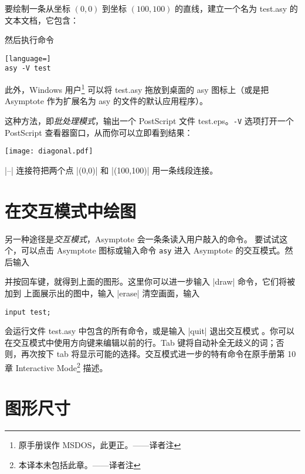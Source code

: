 \documentclass[nofonts,CJKnormalspaces]{ctexbook}[2009/05/20]
\newcommand*\prgname[1]{\textsf{#1}}
\newcommand\transnote[1]{\footnote{#1——译者注}}
\begin{document}
要绘制一条从坐标 $(0, 0)$ 到坐标 $(100, 100)$ 的直线，建立一个名为
\prgname{test.asy} 的文本文档，它包含：

然后执行命令
\begin{lstlisting}[language=]
asy -V test
\end{lstlisting}
此外，\prgname{Windows} 用户\transnote{原手册误作 \prgname{MSDOS}，此更正。}
可以将 \prgname{test.asy} 拖放到桌面的 \prgname{asy} 图标上（或是把
\prgname{Asymptote} 作为扩展名为 \prgname{asy} 的文件的默认应用程序）。

这种方法，即\emph{批处理模式}，输出一个 \prgname{PostScript} 文件
\prgname{test.eps}。\verb=-V= 选项打开一个
\prgname{PostScript} 查看器窗口，从而你可以立即看到结果：
\begin{center}
  \texttt{[image: diagonal.pdf]}
\end{center}

|--| 连接符把两个点 |(0,0)| 和 |(100,100)| 用一条线段连接。

\section{在交互模式中绘图}

另一种途径是\emph{交互模式}，\prgname{Asymptote} 会一条条读入用户敲入的命令。
要试试这个，可以点击 \prgname{Asymptote} 图标或输入命令 \verb=asy= 进入
\prgname{Asymptote} 的交互模式。然后输入

并按回车键，就得到上面的图形。这里你可以进一步输入 |draw| 命令，它们将被加到
上面展示出的图中，输入 |erase| 清空画面，输入
\begin{lstlisting}
input test;
\end{lstlisting}
会运行文件 \prgname{test.asy} 中包含的所有命令，或是输入 |quit| 退出交互模式
。你可以在交互模式中使用方向键来编辑以前的行。Tab 键将自动补全无歧义的词；否
则，再次按下 tab 将显示可能的选择。交互模式进一步的特有命令在原手册第 10 章
Interactive Mode\transnote{本译本未包括此章。} 描述。

\section{图形尺寸}
\end{document}
